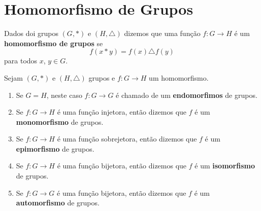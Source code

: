 \section{Homomorfismo de Grupos} %
\label{sec:homomorfismo_de_grupos}


\begin{definicao}
	Dados doi grupos $(G, *)$ e $(H,\triangle)$ dizemos que uma fun\c{c}\~ao $f : G \to H$ \'e um \textbf{homomorfismo de grupos} se
	\[
		f(x * y) = f(x)\triangle f(y)
	\]
	para todos $x$, $y \in G$.
\end{definicao}

\begin{observacao}
	Sejam $(G, *)$ e $(H, \triangle)$ grupos e $f : G \to H$ um homomorfismo.
	\begin{enumerate}[label={\arabic*})]
		\item Se $G = H$, neste caso $f : G \to G$ \'e chamado de um \textbf{endomorfimos} de grupos.
		\item Se $f : G \to H$ \'e uma fun\c{c}\~ao injetora, ent\~ao dizemos que $f$ \'e um \textbf{monomorfismo} de grupos.
		\item Se $f : G \to H$ \'e uma fun\c{c}\~ao sobrejetora, ent\~ao dizemos que $f$ \'e um \textbf{epimorfismo} de grupos.
		\item Se $f : G \to H$ \'e uma fun\c{c}\~ao bijetora, ent\~ao dizemos que $f$ \'e um \textbf{isomorfismo} de grupos.
		\item Se $f : G \to G$ \'e uma fun\c{c}\~ao bijetora, ent\~ao dizemos que $f$ \'e um \textbf{automorfismo} de grupos.
	\end{enumerate}
\end{observacao}


